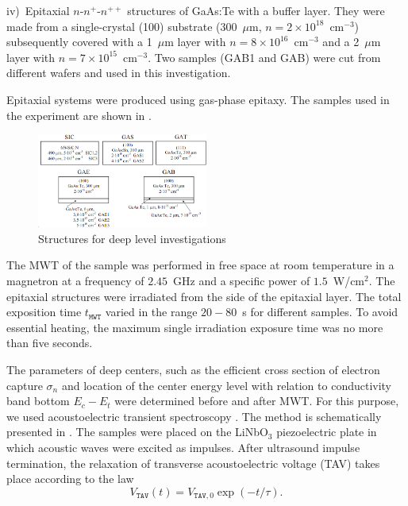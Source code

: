 \documentclass[10pt]{iopart}
\begin{document}
\noindent
iv)~Epitaxial $n$-$n^+$-$n^{++}$ structures of GaAs:Te with a buffer layer.
 They were made from a single-crystal (100) substrate (300~$\mu$m, $n= 2\times10^{18}$~cm$^{-3}$)
  subsequently covered with a 1~$\mu$m layer with $n=8\times10^{16}$~cm$^{-3}$ and
  a 2~$\mu$m layer with $n=7\times10^{15}$~cm$^{-3}$.
  Two samples (GAB1 and GAB) were cut from different wafers and used in this investigation.

Epitaxial systems were produced using gas-phase epitaxy.
The samples used in the experiment are shown in .

\begin{figure}
\includegraphics[width=0.5\textwidth]{Fig1}
\caption{\label{figSamp_TAV}
Structures for deep level investigations
}%
\end{figure}

The MWT of the sample was performed in free space at room temperature in a magnetron at a frequency of  $2.45$~GHz
and a specific power of $1.5$~W/cm$^{2}$.
The epitaxial structures were irradiated from the side of the epitaxial layer.
The total exposition time $t_\mathtt{MWT}$ varied in the range $20-80$~s for different samples.
To avoid essential heating, the maximum single irradiation exposure time was no more than  five seconds.


The parameters of deep centers, such as the efficient cross section of electron capture $\sigma_n$
and location of the center energy level with relation to conductivity band bottom $E_c-E_t$ were determined before and after MWT.
For this purpose, we used acoustoelectric transient spectroscopy \cite{OstrovPAN,OlikhSSC,PANnewEn,OstrovskiiSST}.
The method is schematically presented in .
The samples were placed on the LiNbO$_3$ piezoelectric plate in which acoustic waves were excited as impulses.
After ultrasound impulse termination, the relaxation of transverse acoustoelectric voltage (TAV) takes place according to the law
\begin{equation}\label{eqVtav}
  V_\mathtt{TAV}(t)=V_{\mathtt{TAV},0}\exp(-t/\tau).
\end{equation}
\end{document}
